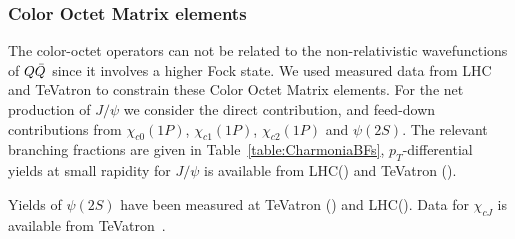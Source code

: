 \documentclass[aps,prc,preprint,superscriptaddress,showpacs,showkeys,amsmath]{revtex4-1}
\begin{document}
\subsubsection{Color Octet Matrix elements}
The color-octet operators can not be related to the non-relativistic
wavefunctions of $Q{\bar{Q}}$ since it involves a higher Fock state.
We used measured data from LHC and TeVatron to constrain these  Color Octet Matrix elements.
 For the net production of $J/\psi$ we consider the direct contribution, and
feed-down contributions from $\chi_{c0}(1P)$, $\chi_{c1}(1P)$,
$\chi_{c2}(1P)$ and $\psi(2S)$. The relevant branching fractions are given
in Table~\ref{table:CharmoniaBFs},
$p_T$-differential yields at small rapidity for $J/\psi$ is available from
LHC(\cite{Chatrchyan:2011kc,Khachatryan:2015rra,Aad:2015duc}) and TeVatron
(\cite{Acosta:2004yw}). 

Yields of $\psi(2S)$ have been measured
at TeVatron (\cite{Aaltonen:2009dm,Abe:1997yz}) and
LHC(\cite{Chatrchyan:2011kc}). Data for $\chi_{cJ}$ is available from
TeVatron~\cite{Abe:1997yz}.  
\end{document}

